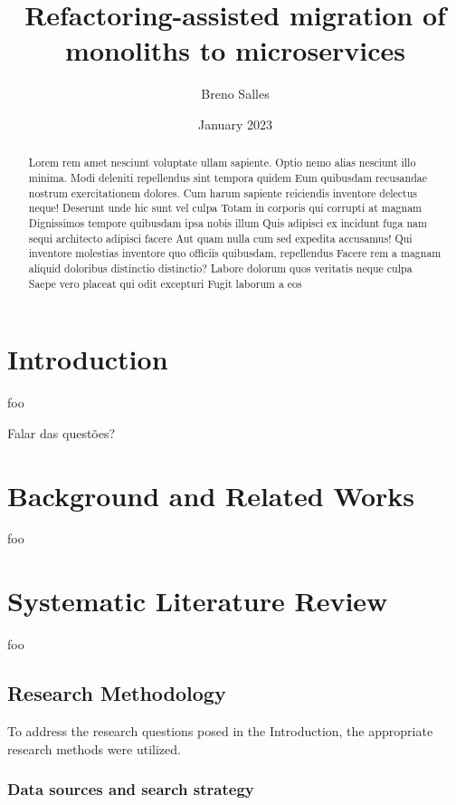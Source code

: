 \documentclass[conference]{IEEEtran}
\title{Refactoring-assisted migration of monoliths to microservices}
\author{Breno Salles} \date{January 2023}
\begin{document}
\maketitle

\begin{abstract}

  Lorem rem amet nesciunt voluptate ullam sapiente. Optio nemo alias nesciunt
  illo minima. Modi deleniti repellendus sint tempora quidem Eum quibusdam
  recusandae nostrum exercitationem dolores. Cum harum sapiente reiciendis
  inventore delectus neque! Deserunt unde hic sunt vel culpa Totam in corporis
  qui corrupti at magnam Dignissimos tempore quibusdam ipsa nobis illum Quis
  adipisci ex incidunt fuga nam sequi architecto adipisci facere Aut quam nulla
  cum sed expedita accusamus! Qui inventore molestias inventore quo officiis
  quibusdam, repellendus Facere rem a magnam aliquid doloribus distinctio
  distinctio? Labore dolorum quos veritatis neque culpa Saepe vero placeat qui
  odit excepturi Fugit laborum a eos

\end{abstract}

\section{Introduction} foo

Falar das questões?

\section{Background and Related Works} foo

\section{Systematic Literature Review} foo

\subsection{Research Methodology} \label{sub:research-methodology}

To address the research questions posed in the Introduction, the appropriate
research methods were utilized.

\subsubsection{Data sources and search strategy} \label{sub:search-strategy}
\end{document}

